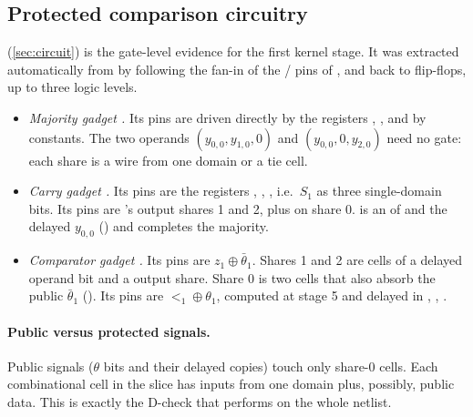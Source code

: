 \subsection{Protected comparison circuitry}\label{app:cmp-circuit}
 (\cref{sec:circuit}) is the gate-level evidence for the first kernel stage. It was extracted automatically from  by following the fan-in of the / pins of ,  and  back to flip-flops, up to three logic levels.
\begin{itemize}
  \item \emph{Majority gadget .} Its pins are driven directly by the registers , ,  and by constants. The two operands $(y_{0,0}, y_{1,0}, 0)$ and $(y_{0,0}, 0, y_{2,0})$ need no gate: each share is a wire from one domain or a tie cell.
  \item \emph{Carry gadget .} Its  pins are the registers , , , i.e.\ $S_1$ as three single-domain bits. Its  pins are 's output shares 1 and 2, plus  on share 0.  is an  of  and the delayed $y_{0,0}$ () and completes the majority.
  \item \emph{Comparator gadget .} Its  pins are $z_1 \oplus \bar\theta_1$. Shares 1 and 2 are  cells of a delayed operand bit and a  output share. Share 0 is two  cells that also absorb the public $\bar\theta_1$ (). Its  pins are $\lt_1 \oplus \theta_1$, computed at stage 5 and delayed in , , .
\end{itemize}
\paragraph{Public versus protected signals.} Public signals ($\theta$ bits and their delayed copies) touch only share-0 cells. Each combinational cell in the slice has inputs from one domain plus, possibly, public data. This is exactly the D-check that  performs on the whole netlist.

